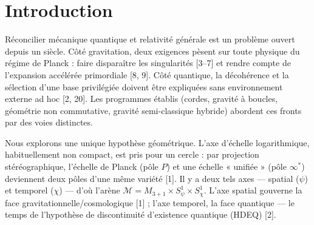 \documentclass[11pt,a4paper]{article}
\newcommand{\statut}[1]{{\footnotesize\textsf{[#1]}}}
\theoremstyle{definition}
\begin{document}
\begin{abstract}
\smallskip\noindent\textbf{Mots-cl\'es :} dualit\'e d'\'echelle ; gravit\'e scalaire-tenseur ;
couplage non minimal ; inflation naturelle ; trous noirs r\'eguliers ; existence quantique
intermittente ; d\'ecoh\'erence intrins\`eque ; horloge relationnelle ; unification.\\
\textbf{PACS :} 04.50.Kd, 04.70.Bw, 98.80.Cq, 03.65.Ta, 04.62.+v.\quad
\textbf{MSC :} 83C57, 83D05, 83F05, 81P15.

\smallskip\noindent\textit{Statut \'epist\'emique :} \statut{preuve} alg\`ebre exacte / calcul
formel $\cdot$ \statut{num\'erique} int\'egration reproductible $\cdot$ \statut{conjecture}
plausible, non prouv\'e $\cdot$ \statut{heuristique} analogie $\cdot$ \statut{sp\'eculation}
ouvert $\cdot$ \statut{ouvert} \`a \'etablir $\cdot$ \statut{\`a v\'erifier} r\'ef.\ externe.
Aucune conjecture n'est pr\'esent\'ee comme un th\'eor\`eme.
\end{abstract}

\section{Introduction}
R\'econcilier m\'ecanique quantique et relativit\'e g\'en\'erale est un probl\`eme ouvert depuis
un si\`ecle. C\^ot\'e gravitation, deux exigences p\`esent sur toute physique du r\'egime de
Planck : faire dispara\^itre les singularit\'es [3--7] et rendre compte de l'expansion
acc\'el\'er\'ee primordiale [8, 9]. C\^ot\'e quantique, la d\'ecoh\'erence et la s\'election d'une
base privil\'egi\'ee doivent \^etre expliqu\'ees sans environnement externe ad hoc [2, 20]. Les
programmes \'etablis (cordes, gravit\'e \`a boucles, g\'eom\'etrie non commutative, gravit\'e
semi-classique hybride) abordent ces fronts par des voies distinctes.

Nous explorons une unique hypoth\`ese g\'eom\'etrique. L'axe d'\'echelle logarithmique,
habituellement non compact, est pris pour un cercle : par projection st\'er\'eographique,
l'\'echelle de Planck (p\^ole $P$) et une \'echelle « unifi\'ee » (p\^ole $\infty^*$) deviennent
deux p\^oles d'une m\^eme vari\'et\'e [1]. Il y a deux tels axes --- spatial ($\psi$) et temporel
($\chi$) --- d'o\`u l'ar\`ene $\mathcal{M}=M_{3+1}\times S^1_\psi\times S^1_\chi$. L'axe spatial
gouverne la face gravitationnelle/cosmologique [1] ; l'axe temporel, la face quantique --- le
temps de l'hypoth\`ese de discontinuit\'e d'existence quantique (HDEQ) [2].
\end{document}
